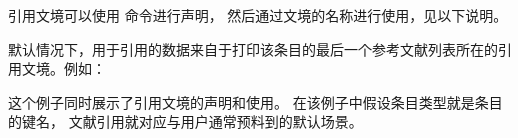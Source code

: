 
引用文境可以使用  命令进行声明，
然后通过文境的名称进行使用，见以下说明。

默认情况下，用于引用的数据来自于打印该条目的最后一个参考文献列表所在的引用文境。例如：

\begin{ltxexample}[style=latex]{}


\cite{book, article, misc}

\printbibliography[type=book]

\printbibliography[type=article]

\newrefcontext[sorting=ydnt]
\printbibliography[type=misc]


\end{ltxexample}
%
这个例子同时展示了引用文境的声明和使用。
在该例子中假设条目类型就是条目的键名，
文献引用就对应与用户通常预料到的默认场景。

